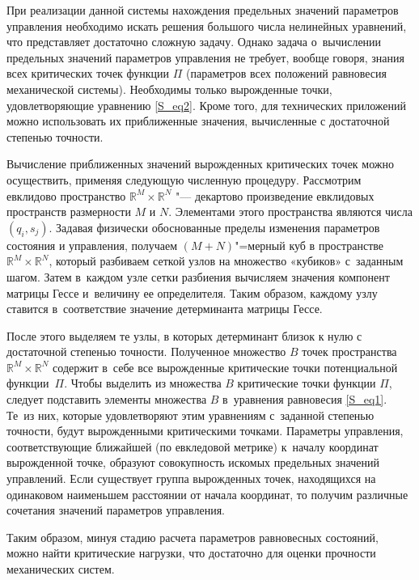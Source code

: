 При реализации данной системы нахождения предельных значений параметров управления необходимо искать решения большого числа нелинейных уравнений, что представляет достаточно сложную задачу. 
Однако задача о~вычислении предельных значений параметров управления не требует, вообще говоря, знания всех критических точек функции $ \Pi $ (параметров всех положений равновесия механической системы). Необходимы только вырожденные точки, удовлетворяющие уравнению \eqref{S_eq2}. Кроме того, для технических приложений можно использовать их приближенные значения, вычисленные с достаточной степенью точности. 

Вычисление приближенных значений вырожденных критических точек можно осуществить, применяя следующую численную процедуру. Рассмотрим евклидово пространство $ \mathbb R^M \times \mathbb R^N $ "--- декартово произведение евклидовых пространств размерности $ M $ и $ N $. 
Элементами этого пространства являются числа $ ( q_i,s_j) $. 
Задавая физически обоснованные пределы изменения параметров состояния и управления, получаем $ (M{+}N) $"=мерный куб в пространстве $\mathbb  R^M \times \mathbb R^N $, 
который разбиваем сеткой узлов на множество «кубиков» с~заданным шагом. 
Затем в~каждом узле сетки разбиения вычисляем значения компонент матрицы Гессе и~величину ее определителя. 
Таким образом, каждому узлу ставится в~соответствие значение детерминанта матрицы Гессе. 

После этого выделяем те узлы, в которых детерминант близок к нулю с достаточной степенью точности. 
Полученное множество $B$ точек пространства $ \mathbb R^M \times \mathbb R^N $ содержит в~себе все вырожденные критические точки потенциальной функции~$ \Pi $. 
Чтобы выделить из множества $B$ критические точки функции $ \Pi $, следует подставить элементы множества $B$ в~уравнения равновесия \eqref{S_eq1}.  
Те~из них, которые удовлетворяют этим уравнениям с~заданной степенью точности, будут вырожденными критическими точками. 
Параметры управления,  соответствующие ближайшей (по евкледовой метрике) к~началу координат вырожденной точке, образуют совокупность искомых предельных значений управлений. 
Если существует группа вырожденных точек, находящихся на одинаковом наименьшем расстоянии от начала координат, то получим различные сочетания значений параметров управления.

Таким образом, минуя стадию расчета параметров равновесных состояний, можно найти критические нагрузки, что достаточно для оценки прочности механических систем.

\smallskip

